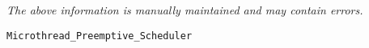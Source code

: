 \label{pkg:microthread\_preemptive\_scheduler}

{\tiny \it The above information is manually maintained and may contain errors.}
\begin{verbatim}
Microthread_Preemptive_Scheduler
\end{verbatim}
